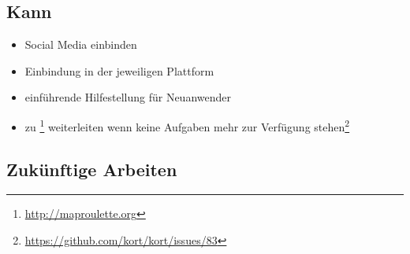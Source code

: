 \subsection{Kann}
\begin{itemize}
	\item Social Media einbinden
	\item Einbindung in  der jeweiligen Plattform
	\item einführende Hilfestellung für Neuanwender
	\item zu \footnote{\url{http://maproulette.org}} weiterleiten wenn keine Aufgaben mehr zur Verfügung stehen\footnote{\url{https://github.com/kort/kort/issues/83}}
\end{itemize}

\subsection{Zukünftige Arbeiten}
